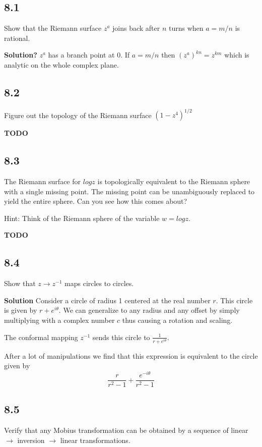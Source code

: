 \documentclass[]{article}
\begin{document}
\subsection*{8.1}
Show that the Riemann surface $z^a$ joins back after $n$ turns when $a = m/n$ is rational.

\textbf{Solution?}
 $z^a$  has a branch point at 0. If  $a = m/n$ then
 $(z^{a})^{kn} = z^{km}$ which is analytic on the whole complex plane. 
 
\subsection*{8.2}
Figure out the topology of the Riemann surface $(1-z^4)^{1/2}$

\textbf{TODO}

\subsection*{8.3}
The Riemann surface for $logz$ is topologically equivalent to the Riemann sphere with 
a single missing point. The missing point can be unambiguously replaced to yield the entire sphere. Can you see how this comes about?

Hint: Think of the Riemann sphere of the variable $w = logz$.

\textbf{TODO}

\subsection*{8.4}
Show that $z \rightarrow z^{-1}$ maps circles to circles.

\textbf{Solution}
Consider a circle of radius 1 centered at the real number $r$. This circle is given
by $r+e^{i\theta}$.
We can generalize to any radius and any offset by simply multiplying with a complex number $c$ thus causing a rotation and scaling. 

The conformal mapping $z^{-1}$ sends this circle to $\frac{1}{r+e^{i\theta}}$.

After a lot of manipulations we find that this expression is equivalent to the circle given by
$$\frac{r}{r^2-1}+\frac{e^{-i\theta}}{r^2-1}$$

\subsection*{8.5}
Verify that any Mobius transformation can be obtained by a sequence of linear $\rightarrow$ inversion $\rightarrow$ linear transformations.
\end{document}
